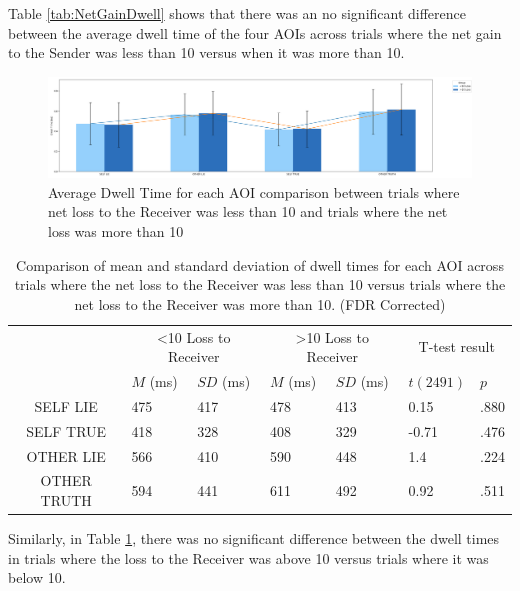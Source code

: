 \documentclass[man, floatsintext]{apa7}
\begin{document}
Table \ref{tab:NetGainDwell} shows that there was an no significant difference between the average dwell time of the four AOIs across trials where the net gain to the Sender was less than 10 versus when it was more than 10.

\begin{figure}[H]
	\includegraphics[width=\linewidth]{../plots/RESPONSE/AvgDwellPerLossPlot.png}
	\caption{Average Dwell Time for each AOI comparison between trials where net loss to the Receiver was less than 10 and trials where the net loss was more than 10}
	\label{fig:AvgDwellPerLoss}
\end{figure}

\begin{table}[H]
	\centering
	\begin{tabular}{|c|p{1.5cm}|p{2cm}|p{1.5cm}|p{2cm}|p{2cm}|p{1.5cm}|}
		\hline
		\multirow{2}{*}{} & \multicolumn{2}{c|}{<10 Loss to Receiver} & \multicolumn{2}{c|}{>10 Loss to Receiver} & \multicolumn{2}{c|}{T-test result} \\ \cline{2-7}
		& $M$ (ms) &$SD$ (ms) & $M$ (ms) & $SD$ (ms) & $t(2491)$ & $p$ \\ \hline
		SELF LIE& 475 & 417 & 478 & 413 & 0.15 & .880  \\ \hline
		SELF TRUE & 418 & 328 & 408 & 329 & -0.71 & .476  \\ \hline
		OTHER LIE & 566 & 410 & 590 & 448 & 1.4 & .224 \\ \hline
		OTHER TRUTH & 594 & 441 & 611 & 492 & 0.92 & .511 \\ \hline
	\end{tabular}
	\vspace{0.3cm}
	\caption{Comparison of mean and standard deviation of dwell times for each AOI across trials where the net loss to the Receiver was less than 10 versus trials where the net loss to the Receiver was more than 10. (FDR Corrected)}
	\label{tab:NetLossDwell}
\end{table}

Similarly, in Table \ref{tab:NetLossDwell}, there was no significant difference between the dwell times in trials where the loss to the Receiver was above 10 versus trials where it was below 10.
\end{document}
